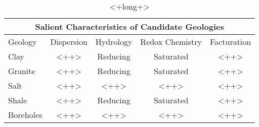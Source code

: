 %
\begin{table}
  \centering
  \footnotesize{
  \begin{tabular}{|l|c|c|c|c|}
    \multicolumn{5}{c}{\textbf{Salient Characteristics of Candidate Geologies}}\\
    \hline
    Geology   & Dispersion & Hydrology & Redox Chemistry & Facturation \\
    \hline
    Clay      & <++> & Reducing & Saturated & <++>  \\
    Granite   & <++> & Reducing & Saturated & <++>  \\
    Salt      & <++> & <++> & <++> & <++>  \\
    Shale     & <++> & Reducing & Saturated & <++>  \\
    Boreholes & <++> & <++> & <++> & <++>  \\
    \hline
  \end{tabular}
  \caption[<+short+>]{<+long+> }
  \label{tab:<++>}
  }
\end{table}



